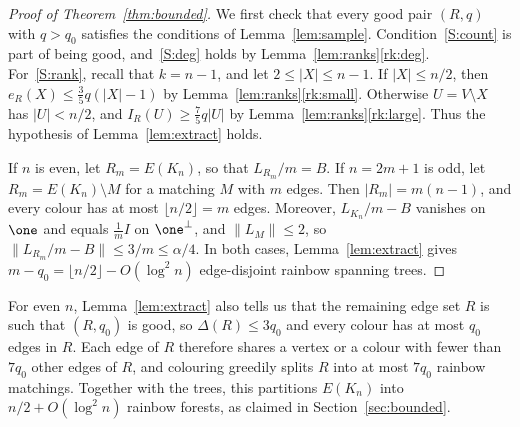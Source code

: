 \begin{proof}[Proof of Theorem~\ref{thm:bounded}]
We first check that every good pair $(R,q)$ with $q>q_0$ satisfies the conditions of Lemma~\ref{lem:sample}.
Condition~\ref{S:count} is part of being good, and~\ref{S:deg} holds by Lemma~\ref{lem:ranks}\ref{rk:deg}.
For~\ref{S:rank}, recall that $k=n-1$, and let $2\le|X|\le n-1$. If $|X|\le n/2$, then $e_R(X)\le\frac35q(|X|-1)$ by Lemma~\ref{lem:ranks}\ref{rk:small}. Otherwise $U=V\setminus X$ has $|U|<n/2$, and $I_R(U)\ge\frac75q|U|$ by Lemma~\ref{lem:ranks}\ref{rk:large}.
Thus the hypothesis of Lemma~\ref{lem:extract} holds.

If $n$ is even, let $R_m=E(K_n)$, so that $L_{R_m}/m=B$.
If $n=2m+1$ is odd, let $R_m=E(K_n)\setminus M$ for a matching $M$ with $m$ edges. Then $|R_m|=m(n-1)$, and every colour has at most $\lfloor n/2\rfloor=m$ edges. Moreover, $L_{K_n}/m-B$ vanishes on $\one$ and equals $\frac1mI$ on $\one^\perp$, and $\|L_M\|\le2$, so $\|L_{R_m}/m-B\|\le3/m\le\alpha/4$.
In both cases, Lemma~\ref{lem:extract} gives $m-q_0=\lfloor n/2\rfloor-O(\log^2n)$ edge-disjoint rainbow spanning trees.
\end{proof}

For even $n$, Lemma~\ref{lem:extract} also tells us that the remaining edge set $R$ is such that $(R,q_0)$ is good, so $\Delta(R)\le3q_0$ and every colour has at most $q_0$ edges in $R$.
Each edge of $R$ therefore shares a vertex or a colour with fewer than $7q_0$ other edges of $R$, and colouring greedily splits $R$ into at most $7q_0$ rainbow matchings.
Together with the trees, this partitions $E(K_n)$ into $n/2+O(\log^2n)$ rainbow forests, as claimed in Section~\ref{sec:bounded}.
